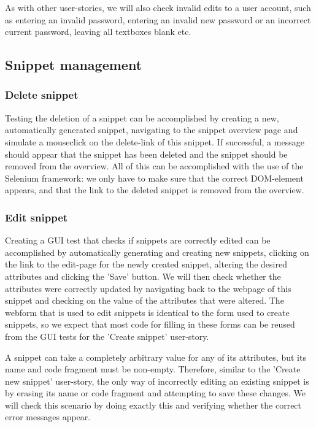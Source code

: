 \documentclass[10pt,a4paper,BCOR12mm, headexclude, footexclude,
  twoside, openright]{scrartcl}
\numberwithin{equation}{section} %
\numberwithin{figure}{section} %
\numberwithin{table}{section} %
\begin{document}
As with other user-stories, we will also check invalid edits to a user account, such as entering an invalid password, entering an invalid new password or an incorrect current password, leaving all textboxes blank etc.
\subsection{Snippet management}

\subsubsection*{Delete snippet}

Testing the deletion of a snippet can be accomplished by creating a new, automatically generated snippet, navigating to the snippet overview page and simulate a mouseclick on the delete-link of this snippet.
If successful, a message should appear that the snippet has been deleted and the snippet should be removed from the overview.
All of this can be accomplished with the use of the Selenium framework: we only have to make sure that the correct DOM-element appears, and that the link to the deleted snippet is removed from the overview.

\subsubsection*{Edit snippet}

Creating a GUI test that checks if snippets are correctly edited can be accomplished by automatically generating and creating new snippets, clicking on the link to the edit-page for the newly created snippet, altering the desired attributes and clicking the 'Save' button. We will then check whether the attributes were correctly updated by navigating back to the webpage of this snippet and checking on the value of the attributes that were altered.
The webform that is used to edit snippets is identical to the form used to create snippets, so we expect that most code for filling in these forms can be reused from the GUI tests for the 'Create snippet' user-story.

A snippet can take a completely arbitrary value for any of its attributes, but its name and code fragment must be non-empty.
Therefore, similar to the 'Create new snippet' user-story, the only way of incorrectly editing an existing snippet is by erasing its name or code fragment and attempting to save these changes.
We will check this scenario by doing exactly this and verifying whether the correct error messages appear.
\end{document}
